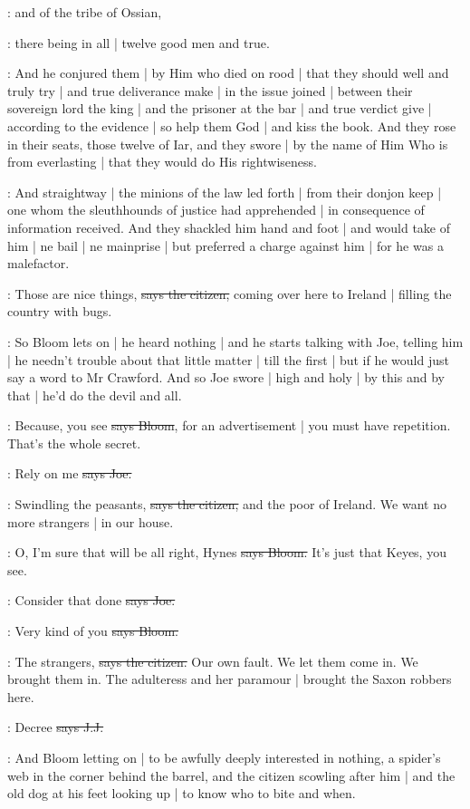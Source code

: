 :
and of the tribe of Ossian,

:
there being in all |
twelve good men and true.

:
And he conjured them |
by Him who died on rood |
that they should well and truly try |
and true deliverance make |
in the issue joined |
between their sovereign lord the king |
and the prisoner at the bar |
and true verdict give |
according to the evidence |
so help them God |
and kiss the book.
And they rose in their seats,
those twelve of Iar,
and they swore |
by the name of Him Who is from everlasting |
that they would do His rightwiseness.

:
And straightway |
the minions of the law led forth |
from their donjon keep |
one whom the sleuthhounds of justice had apprehended |
in consequence of information received.
And they shackled him hand and foot |
and would take of him |
ne bail |
ne mainprise |
but preferred a charge against him |
for he was a malefactor.

\citizen:
Those are nice things,
\sout{says the citizen,}
coming over here to Ireland |
filling the country with bugs.

\Nq:
So Bloom lets on |
he heard nothing |
and he starts talking with Joe,
telling him |
he needn't trouble about that little matter |
till the first |
but if he would just say a word to Mr Crawford.
And so Joe swore |
high and holy |
by this and by that |
he'd do the devil and all.

\Bloom:
Because,
you see
\sout{says Bloom},
for an advertisement |
you must have repetition.
That's the whole secret.

\joe:
Rely on me
\sout{says Joe.}

\citizen:
Swindling the peasants,
\sout{says the citizen,}
and the poor of Ireland.
We want no more strangers |
in our house.

\Bloom:
O,
I'm sure that will be all right,
Hynes
\sout{says Bloom.}
It's just that Keyes,
you see.

\joe:
Consider that done
\sout{says Joe.}

\Bloom:
Very kind of you
\sout{says Bloom.}

\citizen:
The strangers,
\sout{says the citizen.}
Our own fault.
We let them come in.
We brought them in.
The adulteress and her paramour |
brought the Saxon robbers here.

\jjom:
Decree 
\sout{says J.J.}

\Nq:
And Bloom letting on |
to be awfully deeply interested in nothing,
a spider's web in the corner behind the barrel,
and the citizen scowling after him |
and the old dog at his feet looking up |
to know who to bite and when.

